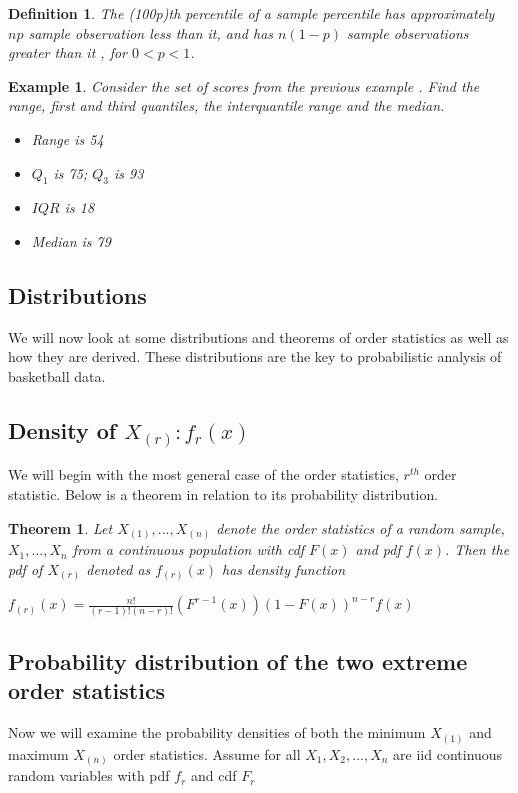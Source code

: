 \documentclass[11pt,a4paper]{article}
\theoremstyle{plain}
\newtheorem{thm}[fact]{Theorem}
\newtheorem{de}[fact]{Definition}
\newtheorem{exmp}[fact]{Example}
\begin{document}
\begin{de}
The (100p)th percentile of a sample percentile has approximately $np$ sample observation less than it, and has $n(1-p)$ sample observations greater than it , for $0<p<1$. 
\end{de}




\begin{exmp}
Consider the set of scores from the previous example . Find the range, first and third quantiles, the interquantile range and the median.
\begin{itemize}
\item Range is 54
  \item $Q_1$ is  75; $Q_3$ is 93
  \item $IQR$ is 18
  \item Median is 79
\end{itemize}


\end{exmp}

\subsection{Distributions}
We will now look at some distributions and theorems of order statistics
as well as how they are derived. These distributions are the key to probabilistic analysis of basketball data. 


\subsection*{Density of $X_{(r)}:f_r(x)$}
We will begin with the most general case of the order statistics, $r^{th}$ order statistic. Below is a theorem in relation to its probability distribution. 
\begin{thm}
Let $X_{(1)},...,X_{(n)}$ denote the order statistics of a random sample, $X_1,...,X_n$ from a continuous population with cdf $F(x)$ and pdf $f(x)$. Then the pdf of $X_{(r)}$ denoted as $f_{(r)}(x)$ has density function
\begin{center}
$f_{(r)}(x)=\frac{n!}{(r-1)!(n-r)!}(F^{r-1}(x))(1-F(x))^{n-r}f(x)$
\end{center}
\end{thm}


\subsection*{Probability distribution of the two extreme order statistics}
Now we will examine the probability densities of both the minimum $X_{(1)}$ and maximum $X_{(n)}$ order statistics. Assume for all $X_1,X_2,...,X_n$ are iid continuous random variables with pdf $f_r$ and cdf $F_r$
\end{document}
